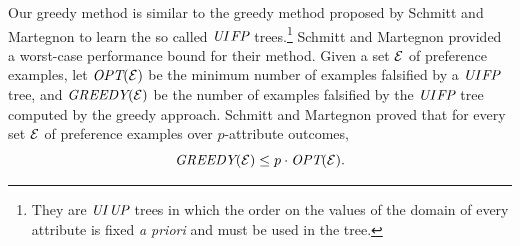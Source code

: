 Our greedy method is similar to the greedy method proposed by Schmitt and 
Martegnon \cite{schmitt2006complexity} to learn the so called $\textit{UI}$$\textit{FP}$ 
trees.\footnote{They are $\textit{UI}$$\textit{UP}$ trees in which the order on the
values of the domain of every attribute is fixed \emph{a priori} and must
be used in the tree.} Schmitt and Martegnon provided a worst-case performance 
bound for their method. Given a set $\mathcal{E}$ of preference examples, let 
$\textit{OPT}(\mathcal{E})$ be the minimum number of examples falsified by a $\textit{UI}$$\textit{FP}$ 
tree, and $\textit{GREEDY}(\mathcal{E})$ be the number of examples falsified by the 
$\textit{UI}$$\textit{FP}$ tree computed by the greedy approach. Schmitt and Martegnon 
proved that for every set $\mathcal{E}$ of preference examples over $p$-attribute 
outcomes,
\[
\textit{GREEDY}(\mathcal{E}) \leq p \cdot \textit{OPT}(\mathcal{E}). 
\]

